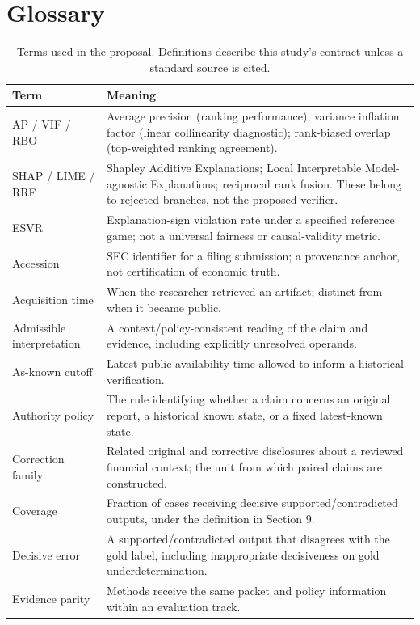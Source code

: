\documentclass[11pt,a4paper]{article}
\begin{document}
\section{Glossary}
\begin{table}[H]\caption{Terms used in the proposal. Definitions describe this study's contract unless a standard source is cited.}
\small\begin{tabularx}{\linewidth}{p{.27\linewidth}Y}\toprule
Term & Meaning\\\midrule
AP / VIF / RBO & Average precision (ranking performance); variance inflation factor (linear collinearity diagnostic); rank-biased overlap (top-weighted ranking agreement).\\
SHAP / LIME / RRF & Shapley Additive Explanations; Local Interpretable Model-agnostic Explanations; reciprocal rank fusion. These belong to rejected branches, not the proposed verifier.\\
ESVR & Explanation-sign violation rate under a specified reference game; not a universal fairness or causal-validity metric.\\
Accession & SEC identifier for a filing submission; a provenance anchor, not certification of economic truth.\\
Acquisition time & When the researcher retrieved an artifact; distinct from when it became public.\\
Admissible interpretation & A context/policy-consistent reading of the claim and evidence, including explicitly unresolved operands.\\
As-known cutoff & Latest public-availability time allowed to inform a historical verification.\\
Authority policy & The rule identifying whether a claim concerns an original report, a historical known state, or a fixed latest-known state.\\
Correction family & Related original and corrective disclosures about a reviewed financial context; the unit from which paired claims are constructed.\\
Coverage & Fraction of cases receiving decisive supported/contradicted outputs, under the definition in Section 9.\\
Decisive error & A supported/contradicted output that disagrees with the gold label, including inappropriate decisiveness on gold underdetermination.\\
Evidence parity & Methods receive the same packet and policy information within an evaluation track.\\

\end{tabularx}
\end{table}
\end{document}
